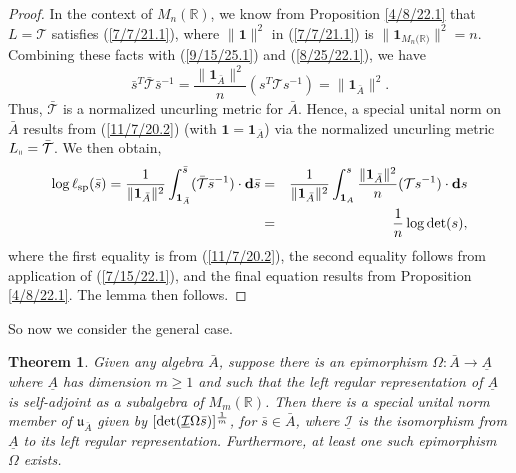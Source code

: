 \documentclass{amsart}
\newtheorem{theorem}{Theorem}
\theoremstyle{definition}
\numberwithin{theorem}{section}
\numberwithin{equation}{section}
\begin{document}
\begin{proof}
In the context of $M_n(\mathbb{R})$, we know from Proposition \ref{4/8/22.1} that $L=\mathcal{T}$ satisfies (\ref{7/7/21.1}), where $\|\mathbf{1}\|^2$ in  (\ref{7/7/21.1}) is $\|\mathbf{1}_{M_n({\mathbb{R})}}\|^2 = n$.  Combining these facts with (\ref{9/15/25.1}) and (\ref{8/25/22.1}), we have \begin{equation}\label{9/27/23.1} \bar{s}^T \bar{\mathcal{T}} \bar{s}^{-1} = \frac{\|\mathbf{1}_{\bar{A}}\|^2}{n}( s^T \mathcal{T} s^{-1}) = \|\mathbf{1}_{\bar{A}}\|^2 .\end{equation} 
Thus, $\mathcal{\bar{T}}$ is a normalized uncurling metric for $\bar{A}$.  Hence, a special unital norm on $\bar{A}$ results from (\ref{11/7/20.2}) (with $\mathbf{1}=\mathbf{1}_{\bar{A}}$)  via the normalized uncurling metric $L_{\shortparallel} = \bar{\mathcal{T}}$.  
  We then obtain, 
\begin{eqnarray}\nonumber \log\ell_{\rm sp}(\bar{s}) = \frac{1}{\|\mathbf{1}_{\bar{A}}\|^2} \int_{\mathbf{1}_{\bar{A}}}^{\bar{s}} (\bar{\mathcal{T}}\bar{s}^{-1})\cdot \mathbf{d}\bar{s}
 &=& \frac{1}{\|\mathbf{1}_{\bar{A}}\|^2} \int_{\mathbf{1}_{A}}^{s} \frac{\|\mathbf{1}_{\bar{A}}\|^2}{n}(\mathcal{T}s^{-1})\cdot \mathbf{d}s \\ &=& \frac{1}{n} \log\text{det}(s),\label{9/27/23.2}\end{eqnarray} where the first equality is from (\ref{11/7/20.2}), the second equality follows from application of (\ref{7/15/22.1}), and the final equation results from Proposition \ref{4/8/22.1}.
The lemma then follows. 
 \end{proof} 
 

So now we consider the general case.
 
  \begin{theorem}\label{11/17/22.1}
  Given any algebra $\bar{A}$, suppose there is an epimorphism $\Omega:\bar{A}\rightarrow \underline{A}$ where $ \underline{A}$ has dimension $m\ge 1$ and such that the left regular representation of $\underline{A}$ is self-adjoint as a subalgebra of $M_m(\mathbb{R})$.  Then there is a special unital norm member of $\mathfrak{u}_{\bar{A}}$ given by $[{\rm det}(\underline{\mathcal{I}}\Omega \bar{s})]^{\frac{1}{m}}$, for $\bar{s}\in\bar{A}$, where $\underline{\mathcal{I}}$ is the isomorphism from $\underline{A}$ to its left regular representation.  Furthermore, at least one such epimorphism $\Omega$ exists. 
   \end{theorem}
 
\end{document}
